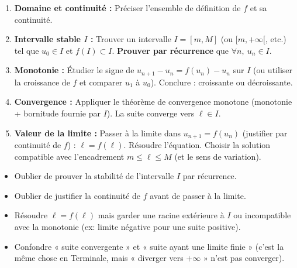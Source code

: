 \documentclass[11pt]{article}
\begin{document}
\begin{methode}[Étude complète d'une suite $u_{n+1}=f(u_n)$ au Bac]
\begin{enumerate}
  \item \textbf{Domaine et continuité :} Préciser l'ensemble de définition de $f$ et sa continuité.
  \item \textbf{Intervalle stable $I$ :} Trouver un intervalle $I=[m,M]$ (ou $[m,+\infty[$, etc.) tel que $u_0\in I$ et $f(I)\subset I$. \textbf{Prouver par récurrence} que $\forall n,\ u_n\in I$.
  \item \textbf{Monotonie :} Étudier le signe de $u_{n+1}-u_n = f(u_n)-u_n$ sur $I$ (ou utiliser la croissance de $f$ et comparer $u_1$ à $u_0$). Conclure : croissante ou décroissante.
  \item \textbf{Convergence :} Appliquer le théorème de convergence monotone (monotonie + bornitude fournie par $I$). La suite converge vers $\ell\in I$.
  \item \textbf{Valeur de la limite :} Passer à la limite dans $u_{n+1}=f(u_n)$ (justifier par continuité de $f$) : $\ell=f(\ell)$. Résoudre l'équation. Choisir la solution compatible avec l'encadrement $m\le \ell\le M$ (et le sens de variation).
\end{enumerate}
\end{methode}

\begin{attention}
\begin{itemize}
  \item Oublier de prouver la stabilité de l'intervalle $I$ par récurrence.
  \item Oublier de justifier la continuité de $f$ avant de passer à la limite.
  \item Résoudre $\ell=f(\ell)$ mais garder une racine extérieure à $I$ ou incompatible avec la monotonie (ex: limite négative pour une suite positive).
  \item Confondre « suite convergente » et « suite ayant une limite finie » (c'est la même chose en Terminale, mais « diverger vers $+\infty$ » n'est pas converger).
\end{itemize}
\end{attention}
\end{document}
